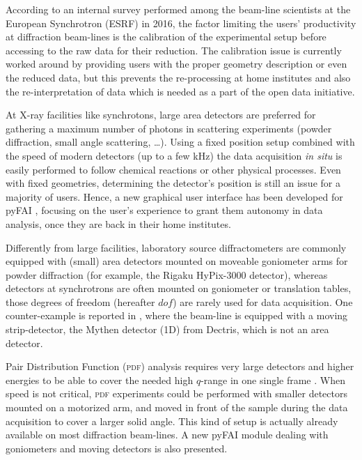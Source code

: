 \documentclass[preprint]{iucr}              %
\begin{document}
According to an internal survey performed among the beam-line scientists at
the European Synchrotron (ESRF) in 2016, the factor limiting the users'
productivity at diffraction beam-lines is the calibration of the experimental
setup before accessing to the raw data for their reduction. 
The calibration issue is currently worked around by providing users with the
proper geometry description or even the reduced data, but this prevents the
re-processing at home institutes and also the re-interpretation of data which
is needed as a part of the open data initiative.

At X-ray facilities like synchrotons, large area detectors are 
preferred for gathering a maximum number of photons in
scattering experiments (powder diffraction, small angle
scattering, \ldots).
Using a fixed position setup combined with the speed of modern detectors (up
to a few kHz) the data acquisition \textit{in situ} is easily
performed to follow chemical reactions or other physical processes.
Even with fixed geometries, determining the detector's position is
still an issue for a majority of users. 
Hence, a new graphical user interface has been developed for pyFAI
\cite{pyFAI_0.18}, focusing on the user's experience to grant them autonomy in
data analysis, once they are back in their home institutes.

Differently from large facilities, laboratory source diffractometers
are commonly equipped with (small) area detectors mounted on moveable goniometer
arms for powder diffraction (for example, the Rigaku HyPix-3000 detector),
whereas detectors at synchrotrons are often mounted on goniometer or
translation tables, those degrees of freedom (hereafter $dof$) are rarely used for data
acquisition.
One counter-example is reported in \cite{Gao:kc5032}, where the beam-line
is equipped with a moving strip-detector, the Mythen detector (1D) from Dectris,
which is not an area detector.




Pair Distribution Function (\textsc{pdf}) analysis requires very large
detectors and higher energies to be able to cover the needed high $q$-range in
one single frame \cite{Chupas:wf5000}.
When speed is not critical, \textsc{pdf} experiments could be performed
with smaller detectors mounted on a motorized arm, and moved in front of
the sample during the data acquisition to cover a larger solid angle. 
This kind of setup is actually already available on most diffraction
beam-lines. 
A new pyFAI module dealing with goniometers and moving detectors is also presented.
\end{document}
